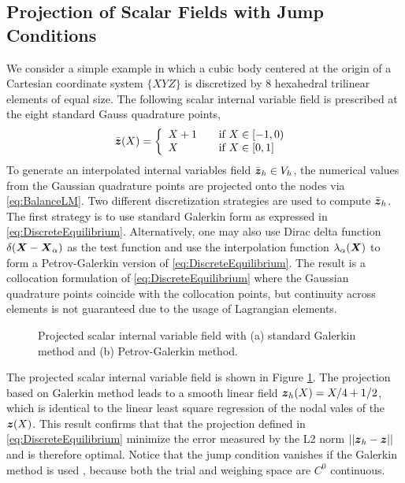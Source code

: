 \documentclass[12pt]{article}
\begin{document}
\subsection{Projection of Scalar Fields with Jump Conditions}
We consider a simple example in which a cubic body centered at the
origin of a Cartesian coordinate system $\{XYZ\}$ is discretized by 8
hexahedral trilinear elements of equal size. The following scalar
internal variable field is prescribed at the eight standard Gauss
quadrature points,
\begin{equation}
\bar{{\boldsymbol{z}}}(X) = \left\{
  \begin{array}{l l}
    X + 1 & \quad \text{if $X \in [-1, 0)$ }\\
     X & \quad \text{if $X \in [0, 1]$ }\\
  \end{array} \right.
  \label{eq:PrescribedScalar}
\end{equation}
To generate an interpolated internal variables field $\bar{{\boldsymbol{z}}}_{h}
\in V_{h}$, the numerical values from the Gaussian quadrature points
are projected onto the nodes via \eqref{eq:BalanceLM}. Two different
discretization strategies are used to compute $\bar{{\boldsymbol{z}}}_{h}$. The
first strategy is to use standard Galerkin form as expressed in
\eqref{eq:DiscreteEquilibrium}. Alternatively, one may also use Dirac
delta function $\delta({\boldsymbol{X}} - {\boldsymbol{X}}_{\alpha})$ as the test function and
use the interpolation function $\lambda_{\alpha}({\boldsymbol{X}})$ to form a
Petrov-Galerkin version of \eqref{eq:DiscreteEquilibrium}. The result
is a collocation formulation of \eqref{eq:DiscreteEquilibrium} where
the Gaussian quadrature points coincide with the collocation points,
but continuity across elements is not guaranteed due to the usage of
Lagrangian elements.
\begin{figure}[htbp]
  \begin{center}
    \unitlength=1.0mm
    \caption{Projected scalar internal variable field with (a) standard
      Galerkin method and (b) Petrov-Galerkin method.}
    \label{fig:ExampleCube}
  \end{center}
\end{figure}

The projected scalar internal variable field is shown in Figure
\ref{fig:ExampleCube}. The projection based on Galerkin method leads
to a smooth linear field ${\boldsymbol{z}}_{h}(X) = X/4 + 1/2$, which is identical
to the linear least square regression of the nodal vales of the
${\boldsymbol{z}}(X)$. This result confirms that that the projection defined in
\eqref{eq:DiscreteEquilibrium} minimize the error measured by the L2
norm $||{\boldsymbol{z}}_{h} - {\boldsymbol{z}} ||$ and is therefore optimal. Notice that the
jump condition vanishes if the Galerkin method is used , because both
the trial and weighing space are $C^{0}$ continuous.
 
\end{document}
